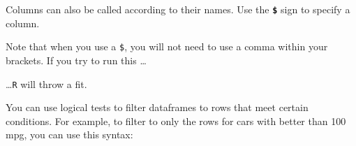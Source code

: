 \documentclass[
]{book}
\newenvironment{Shaded}{\begin{snugshade}}{\end{snugshade}}
\newcommand{\DecValTok}[1]{\textcolor[rgb]{0.00,0.00,0.81}{#1}}
\newcommand{\NormalTok}[1]{#1}
\newcommand{\OperatorTok}[1]{\textcolor[rgb]{0.81,0.36,0.00}{\textbf{#1}}}
\begin{document}
Columns can also be called according to their names. Use the \textbf{\texttt{\$}} sign to specify a column.

\begin{Shaded}
\end{Shaded}

Note that when you use a \texttt{\$}, you will not need to use a comma within your brackets. If you try to run this \ldots{}

\begin{Shaded}
\end{Shaded}

\ldots{}\texttt{R} will throw a fit.

You can use logical tests to filter dataframes to rows that meet certain conditions. For example, to filter to only the rows for cars with better than 100 mpg, you can use this syntax:
\end{document}
